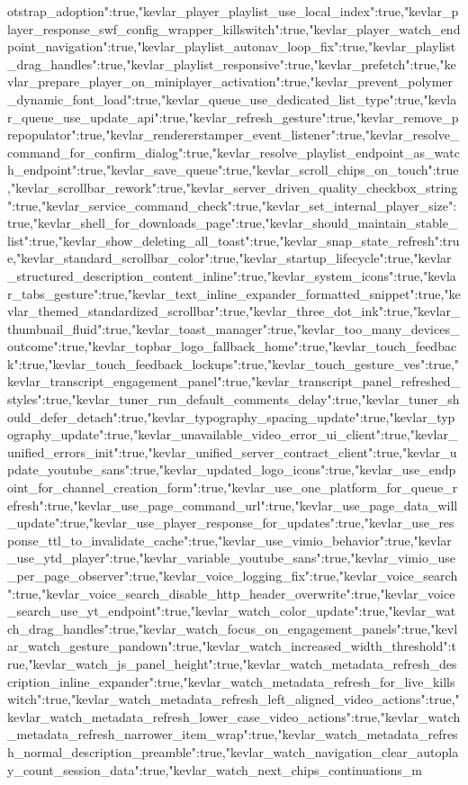 {otstrap_adoption":true,"kevlar_player_playlist_use_local_index":true,"kevlar_player_response_swf_config_wrapper_killswitch":true,"kevlar_player_watch_endpoint_navigation":true,"kevlar_playlist_autonav_loop_fix":true,"kevlar_playlist_drag_handles":true,"kevlar_playlist_responsive":true,"kevlar_prefetch":true,"kevlar_prepare_player_on_miniplayer_activation":true,"kevlar_prevent_polymer_dynamic_font_load":true,"kevlar_queue_use_dedicated_list_type":true,"kevlar_queue_use_update_api":true,"kevlar_refresh_gesture":true,"kevlar_remove_prepopulator":true,"kevlar_rendererstamper_event_listener":true,"kevlar_resolve_command_for_confirm_dialog":true,"kevlar_resolve_playlist_endpoint_as_watch_endpoint":true,"kevlar_save_queue":true,"kevlar_scroll_chips_on_touch":true,"kevlar_scrollbar_rework":true,"kevlar_server_driven_quality_checkbox_string":true,"kevlar_service_command_check":true,"kevlar_set_internal_player_size":true,"kevlar_shell_for_downloads_page":true,"kevlar_should_maintain_stable_list":true,"kevlar_show_deleting_all_toast":true,"kevlar_snap_state_refresh":true,"kevlar_standard_scrollbar_color":true,"kevlar_startup_lifecycle":true,"kevlar_structured_description_content_inline":true,"kevlar_system_icons":true,"kevlar_tabs_gesture":true,"kevlar_text_inline_expander_formatted_snippet":true,"kevlar_themed_standardized_scrollbar":true,"kevlar_three_dot_ink":true,"kevlar_thumbnail_fluid":true,"kevlar_toast_manager":true,"kevlar_too_many_devices_outcome":true,"kevlar_topbar_logo_fallback_home":true,"kevlar_touch_feedback":true,"kevlar_touch_feedback_lockups":true,"kevlar_touch_gesture_ves":true,"kevlar_transcript_engagement_panel":true,"kevlar_transcript_panel_refreshed_styles":true,"kevlar_tuner_run_default_comments_delay":true,"kevlar_tuner_should_defer_detach":true,"kevlar_typography_spacing_update":true,"kevlar_typography_update":true,"kevlar_unavailable_video_error_ui_client":true,"kevlar_unified_errors_init":true,"kevlar_unified_server_contract_client":true,"kevlar_update_youtube_sans":true,"kevlar_updated_logo_icons":true,"kevlar_use_endpoint_for_channel_creation_form":true,"kevlar_use_one_platform_for_queue_refresh":true,"kevlar_use_page_command_url":true,"kevlar_use_page_data_will_update":true,"kevlar_use_player_response_for_updates":true,"kevlar_use_response_ttl_to_invalidate_cache":true,"kevlar_use_vimio_behavior":true,"kevlar_use_ytd_player":true,"kevlar_variable_youtube_sans":true,"kevlar_vimio_use_per_page_observer":true,"kevlar_voice_logging_fix":true,"kevlar_voice_search":true,"kevlar_voice_search_disable_http_header_overwrite":true,"kevlar_voice_search_use_yt_endpoint":true,"kevlar_watch_color_update":true,"kevlar_watch_drag_handles":true,"kevlar_watch_focus_on_engagement_panels":true,"kevlar_watch_gesture_pandown":true,"kevlar_watch_increased_width_threshold":true,"kevlar_watch_js_panel_height":true,"kevlar_watch_metadata_refresh_description_inline_expander":true,"kevlar_watch_metadata_refresh_for_live_killswitch":true,"kevlar_watch_metadata_refresh_left_aligned_video_actions":true,"kevlar_watch_metadata_refresh_lower_case_video_actions":true,"kevlar_watch_metadata_refresh_narrower_item_wrap":true,"kevlar_watch_metadata_refresh_normal_description_preamble":true,"kevlar_watch_navigation_clear_autoplay_count_session_data":true,"kevlar_watch_next_chips_continuations_m}
